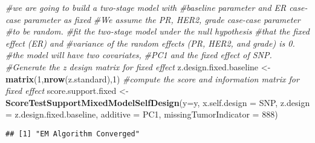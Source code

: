\documentclass[11pt,]{article}
\newenvironment{Shaded}{\begin{snugshade}}{\end{snugshade}}
\newcommand{\KeywordTok}[1]{\textcolor[rgb]{0.13,0.29,0.53}{\textbf{#1}}}
\newcommand{\DataTypeTok}[1]{\textcolor[rgb]{0.13,0.29,0.53}{#1}}
\newcommand{\DecValTok}[1]{\textcolor[rgb]{0.00,0.00,0.81}{#1}}
\newcommand{\StringTok}[1]{\textcolor[rgb]{0.31,0.60,0.02}{#1}}
\newcommand{\CommentTok}[1]{\textcolor[rgb]{0.56,0.35,0.01}{\textit{#1}}}
\newcommand{\NormalTok}[1]{#1}
\begin{document}
\begin{Shaded}
\begin{Highlighting}[]
\CommentTok{#we are going to build a two-stage model with }
\CommentTok{#baseline parameter and ER case-case parameter as fixed}
\CommentTok{#We assume the PR, HER2, grade case-case parameter }
\CommentTok{#to be random.}
\CommentTok{#fit the two-stage model under the null hypothesis}
\CommentTok{#that the fixed effect (ER) and }
\CommentTok{#variance of the random effects (PR, HER2, and grade) is 0.}
\CommentTok{#the model will have two covariates, }
\CommentTok{#PC1 and the fixed effect of SNP.}
\CommentTok{#Generate the z design matrix for fixed effect}
\NormalTok{z.design.fixed.baseline <-}\StringTok{ }\KeywordTok{matrix}\NormalTok{(}\DecValTok{1}\NormalTok{,}\KeywordTok{nrow}\NormalTok{(z.standard),}\DecValTok{1}\NormalTok{)}
\CommentTok{#compute the score and information matrix for fixed effect}
\NormalTok{score.support.fixed <-}\StringTok{ }\KeywordTok{ScoreTestSupportMixedModelSelfDesign}\NormalTok{(}\DataTypeTok{y=}\NormalTok{y,}
                        \DataTypeTok{x.self.design  =}\NormalTok{ SNP,}
                        \DataTypeTok{z.design =}\NormalTok{ z.design.fixed.baseline,}
                        \DataTypeTok{additive =}\NormalTok{ PC1,}
                        \DataTypeTok{missingTumorIndicator =} \DecValTok{888}\NormalTok{)}
\end{Highlighting}
\end{Shaded}

\begin{verbatim}
## [1] "EM Algorithm Converged"
\end{verbatim}
\end{document}
